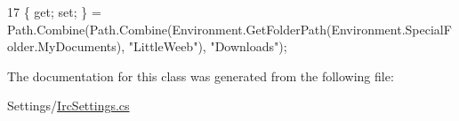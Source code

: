 \begin{DoxyCode}
17 \{ \textcolor{keyword}{get}; \textcolor{keyword}{set}; \} = Path.Combine(Path.Combine(Environment.GetFolderPath(Environment.SpecialFolder.MyDocuments),
       \textcolor{stringliteral}{"LittleWeeb"}), \textcolor{stringliteral}{"Downloads"});
\end{DoxyCode}


The documentation for this class was generated from the following file\+:\begin{DoxyCompactItemize}
\item 
Settings/\mbox{\hyperlink{_irc_settings_8cs}{Irc\+Settings.\+cs}}\end{DoxyCompactItemize}
